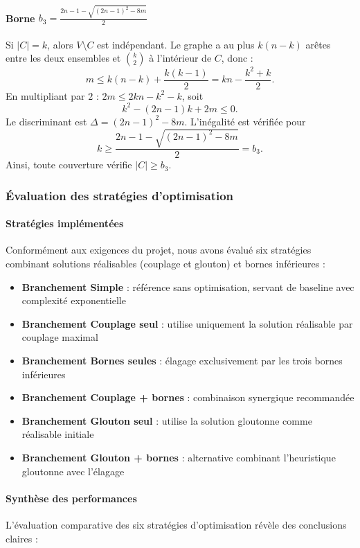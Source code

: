 \documentclass[11pt,a4paper]{article}
\begin{document}
\paragraph{Borne $b_3=\frac{2n-1-\sqrt{(2n-1)^2-8m}}{2}$}
Si $|C|=k$, alors $V\setminus C$ est indépendant. Le graphe a au plus $k(n-k)$ arêtes entre les deux ensembles et $\binom{k}{2}$ à l’intérieur de $C$, donc :
\[
m\le k(n-k)+\frac{k(k-1)}{2}=kn-\frac{k^2+k}{2}.
\]
En multipliant par $2$ : $2m\le 2kn-k^2-k$, soit
\[
k^2-(2n-1)k+2m\le0.
\]
Le discriminant est $\Delta=(2n-1)^2-8m$. L’inégalité est vérifiée pour
\[
k\ge\frac{2n-1-\sqrt{(2n-1)^2-8m}}{2}=b_3.
\]
Ainsi, toute couverture vérifie $|C|\ge b_3$.

\subsubsection{Évaluation des stratégies d'optimisation}

\paragraph{Stratégies implémentées}
Conformément aux exigences du projet, nous avons évalué six stratégies combinant solutions réalisables (couplage et glouton) et bornes inférieures :
\begin{itemize}
  \item \textbf{Branchement Simple} : référence sans optimisation, servant de baseline avec complexité exponentielle
  \item \textbf{Branchement Couplage seul} : utilise uniquement la solution réalisable par couplage maximal
  \item \textbf{Branchement Bornes seules} : élagage exclusivement par les trois bornes inférieures
  \item \textbf{Branchement Couplage + bornes} : combinaison synergique recommandée
  \item \textbf{Branchement Glouton seul} : utilise la solution gloutonne comme réalisable initiale  
  \item \textbf{Branchement Glouton + bornes} : alternative combinant l'heuristique gloutonne avec l'élagage
\end{itemize}

\paragraph{Synthèse des performances}
L'évaluation comparative des six stratégies d'optimisation révèle des conclusions claires :
\end{document}
